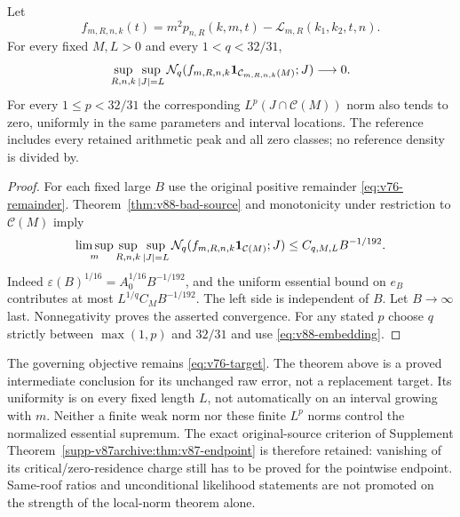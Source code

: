 \begin{theorem}
\label{thm:v88-raw-limit}
Let
\[
 f_{m,R,n,k}(t)=m^2p_{n,R}(k,m,t)
                    -\mathcal L_{m,R}(k_1,k_2,t,n).
\]
For every fixed $M,L>0$ and every $1<q<32/31$,
\begin{equation}\label{eq:v88-raw-weak}
 \sup_{R,n,k}\sup_{|J|=L}
 \mathcal N_q(f_{m,R,n,k}\one_{\mathcal C_{m,R,n,k}(M)};J)
                                      \longrightarrow0.
\end{equation}
For every $1\le p<32/31$ the corresponding $L^p(J\cap\mathcal C(M))$
norm also tends to zero, uniformly in the same parameters and interval
locations. The reference includes every retained arithmetic peak and
all zero classes; no reference density is divided by.
\end{theorem}
\begin{proof}
For each fixed large $B$ use the original positive remainder
\eqref{eq:v76-remainder}. Theorem~\ref{thm:v88-bad-source} and
monotonicity under restriction to $\mathcal C(M)$ imply
\[
 \limsup_m\sup_{R,n,k}\sup_{|J|=L}
 \mathcal N_q(f_{m,R,n,k}\mathbf1_{\mathcal C(M)};J)
                                      \le C_{q,M,L}B^{-1/192}.
\]
Indeed $\varepsilon(B)^{1/16}=A_0^{1/16}B^{-1/192}$, and the
uniform essential bound on $e_B$ contributes at most
$L^{1/q}C_MB^{-1/192}$. The left side is independent of $B$.
Let $B\to\infty$ last. Nonnegativity proves the asserted convergence.
For any stated $p$ choose $q$ strictly between $\max(1,p)$ and
$32/31$ and use \eqref{eq:v88-embedding}.
\end{proof}

The governing objective remains \eqref{eq:v76-target}. The theorem
above is a proved intermediate conclusion for its unchanged raw
error, not a replacement target. Its uniformity is on every fixed
length $L$, not automatically on an interval growing with $m$.
Neither a finite weak norm nor these finite $L^p$ norms control the
normalized essential supremum. The exact original-source criterion
of Supplement Theorem~\ref{supp-v87archive:thm:v87-endpoint} is
therefore retained: vanishing of its critical/zero-residence charge
still has to be proved for the pointwise endpoint. Same-roof ratios
and unconditional likelihood statements are not promoted on the
strength of the local-norm theorem alone.
